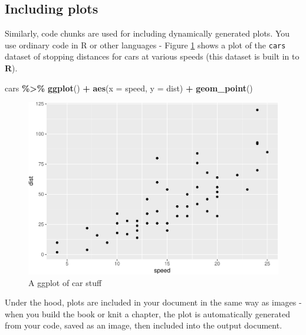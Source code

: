 \documentclass[a4paper, twoside]{templates/ociamthesis}
\newenvironment{Shaded}{\begin{snugshade}}{\end{snugshade}}
\newcommand{\DataTypeTok}[1]{\textcolor[rgb]{0.13,0.29,0.53}{#1}}
\newcommand{\KeywordTok}[1]{\textcolor[rgb]{0.13,0.29,0.53}{\textbf{#1}}}
\newcommand{\NormalTok}[1]{#1}
\newcommand{\OperatorTok}[1]{\textcolor[rgb]{0.81,0.36,0.00}{\textbf{#1}}}
\newcommand{\StringTok}[1]{\textcolor[rgb]{0.31,0.60,0.02}{#1}}
\renewenvironment{Shaded}
{
  \vspace{10pt}%
  \begin{snugshade}%
}{%
  \end{snugshade}%
  \vspace{8pt}%
}
\theoremstyle{definition}
\theoremstyle{definition}
\theoremstyle{definition}
\theoremstyle{definition}
\theoremstyle{remark}
\begin{document}
\hypertarget{including-plots}{%
\subsection{Including plots}\label{including-plots}}

Similarly, code chunks are used for including dynamically generated plots.
You use ordinary code in R or other languages - Figure \ref{fig:cars-plot} shows a plot of the \texttt{cars} dataset of stopping distances for cars at various speeds (this dataset is built in to \textbf{R}).

\begin{Shaded}
\begin{Highlighting}[]
\NormalTok{cars }\OperatorTok{\%\textgreater{}\%}\StringTok{ }
\StringTok{  }\KeywordTok{ggplot}\NormalTok{() }\OperatorTok{+}
\StringTok{    }\KeywordTok{aes}\NormalTok{(}\DataTypeTok{x =}\NormalTok{ speed, }\DataTypeTok{y =}\NormalTok{ dist) }\OperatorTok{+}
\StringTok{    }\KeywordTok{geom\_point}\NormalTok{()}
\end{Highlighting}
\end{Shaded}

\begin{figure}
\centering
\includegraphics{_main_files/figure-latex/cars-plot-1.pdf}
\caption{\label{fig:cars-plot}A ggplot of car stuff}
\end{figure}

Under the hood, plots are included in your document in the same way as images - when you build the book or knit a chapter, the plot is automatically generated from your code, saved as an image, then included into the output document.
\end{document}
